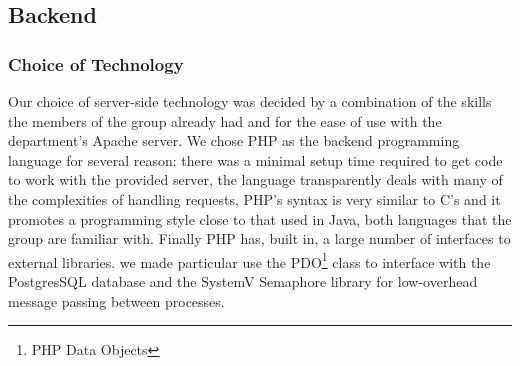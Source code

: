 \documentclass[12pt]{amsart}
\begin{document}
  \subsection{Backend}
    \subsubsection{Choice of Technology}
      \begin{flushleft}
      Our choice of server-side technology was decided by a combination of the
      skills the members of the group already had and for the ease of use with
      the department's Apache server. We chose PHP as the backend programming
      language for several reason: there was a minimal setup time
      required to get code to work with the provided server, the
      language transparently deals with many of the complexities of handling
      requests, PHP's syntax is very similar to C's and it promotes a programming style close to
      that used in Java, both languages that the group are familiar with. Finally
      PHP has, built in, a large number of interfaces to external libraries. we made 
      particular use the PDO\footnote{PHP Data Objects} class to interface
      with the PostgresSQL database and the SystemV Semaphore library for
      low-overhead message passing between processes.       
      \end{flushleft}
\end{document}
